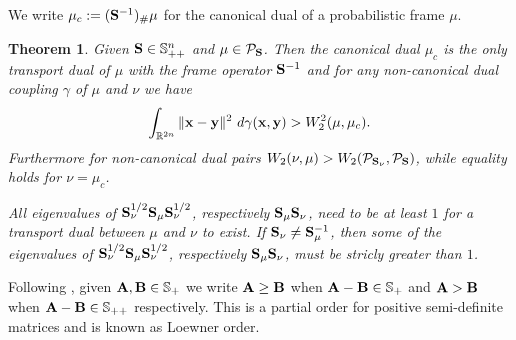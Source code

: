 \documentclass{amsart}
\numberwithin{equation}{section}
\newcommand\cP{{\mathcal P}}
\newcommand\bA{{\bf A}}
\newcommand\bS{{\bf S}}
\newcommand\R{{\mathbb R}}
\newcommand\tr{{\operatorname{tr}}}
\theoremstyle{plain}
\newtheorem{theorem}[subsection]{Theorem}
\theoremstyle{definition}
\begin{document}
We write $\mu_c:=(\bS^{-1})_{\#}\mu$ for the canonical dual of a probabilistic frame $\mu$. 
\begin{theorem}
Given $\bS \in {\mathbb S}^n_{++}$ and $\mu \in \cP_{\bS}$. Then the canonical dual $\mu_c$ is the only
transport dual of $\mu$ with the frame operator $\bS^{-1}$ and for any non-canonical dual coupling $\gamma$ of $\mu$ and $\nu$ 
we have 
\[ \int_{\R^{2n}}\| {\bf x} -{\bf y} \|^2\ d\gamma({\bf x}, {\bf y} ) >  W^2_2(\mu,\mu_c).   \]
Furthermore for non-canonical dual pairs $W_2(\nu, \mu) >  W_2(\cP_{\bS_{\nu}}, \cP_{\bS})$, while equality holds for $\nu=\mu_c$. 

All eigenvalues of $\bS^{1/2}_{\nu}\bS_{\mu} \bS^{1/2}_{\nu}$, respectively 
$\bS_{\mu} \bS_{\nu}$, need to be at least $1$ for a transport dual between $\mu$ and $\nu$ to exist. If 
$\bS_{\nu} \neq \bS^{-1}_{\mu}$, then some of the eigenvalues of $\bS^{1/2}_{\nu}\bS_{\mu} \bS^{1/2}_{\nu}$, respectively $\bS_{\mu} \bS_{\nu}$, must be stricly greater than $1$. 
\end{theorem}
Following \cite{olkin1982distance}, given $\bA, {\bf B} \in \mathbb{S}_+$ we write $\bA \geq {\bf B}$ when $\bA - {\bf B} \in \mathbb{S}_+$ and $\bA > {\bf B}$ when $\bA - {\bf B} \in \mathbb{S}_{++}$ respectively. This is a partial order for positive semi-definite matrices and is known as Loewner order. 
\end{document}
